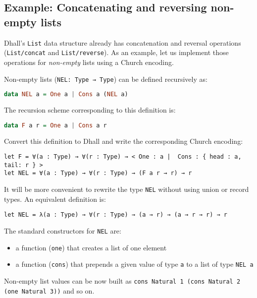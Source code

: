 \subsection{Example: Concatenating and reversing non-empty lists}


Dhall's \lstinline!List! data structure already has concatenation and reversal operations (\lstinline!List/concat! and \lstinline!List/reverse!).
As an example, let us implement those operations for \emph{non-empty} lists using a Church encoding.


Non-empty lists (\lstinline!NEL: Type → Type!) can be defined recursively as:


\begin{lstlisting}[language=Haskell]
data NEL a = One a | Cons a (NEL a)
\end{lstlisting}


The recursion scheme corresponding to this definition is:


\begin{lstlisting}[language=Haskell]
data F a r = One a | Cons a r
\end{lstlisting}


Convert this definition to Dhall and write the corresponding Church encoding:


\begin{lstlisting}[language=Dhall]
let F = ∀(a : Type) → ∀(r : Type) → < One : a |  Cons : { head : a, tail: r } >
let NEL = ∀(a : Type) → ∀(r : Type) → (F a r → r) → r
\end{lstlisting}


It will be more convenient to rewrite the type \lstinline!NEL! without using union or record types. An equivalent definition is:


\begin{lstlisting}[language=Dhall]
let NEL = λ(a : Type) → ∀(r : Type) → (a → r) → (a → r → r) → r
\end{lstlisting}


The standard constructors for \lstinline!NEL! are:


\begin{itemize}
\item{a function (\lstinline!one!) that creates a list of one element}
\item{a function (\lstinline!cons!) that prepends a given value of type \lstinline!a! to a list of type \lstinline!NEL a!}
\end{itemize}
Non-empty list values can be now built as \lstinline!cons Natural 1 (cons Natural 2 (one Natural 3))! and so on.


